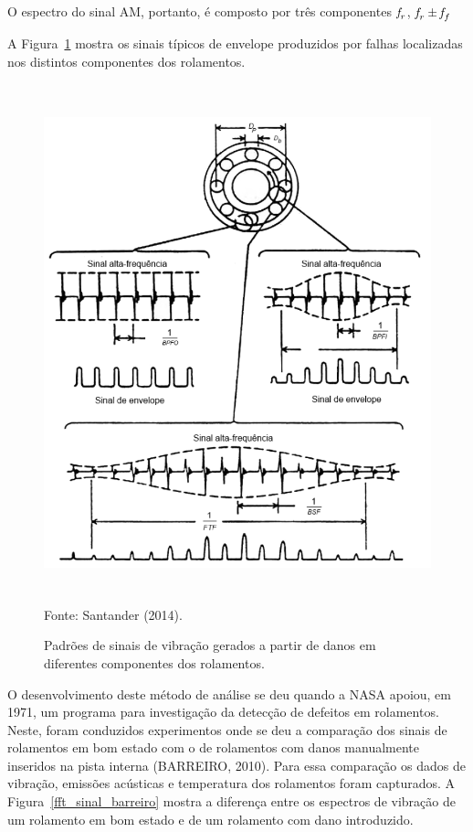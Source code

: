 \documentclass[
	12pt,				
	oneside,			
	a4paper,			
	english,			
	brazil,			
	]{abntex2ppgsi}
\newcommand{\f}{\mkern-2mu f\mkern-3mu}
\begin{document}
O espectro do sinal AM, portanto, é composto por três componentes ${\f}_r$, ${\f}_r \pm {\f}_f$ 

A Figura~\ref{frequencias_sinais_rolamentos} mostra os sinais típicos de envelope produzidos por falhas localizadas nos distintos componentes dos rolamentos. 

\begin{figure}[!htb]
\centering
\caption {Padrões de sinais de vibração gerados a partir de danos em diferentes componentes dos rolamentos.}
\includegraphics[width=\textwidth,height=150mm,keepaspectratio]{frequencias_sinais_rolamentos} \\
Fonte: Santander (2014).
\label{frequencias_sinais_rolamentos}
\end{figure}

O desenvolvimento deste método de análise se deu quando a NASA apoiou, em 1971, um programa para investigação da detecção de defeitos em rolamentos. Neste, foram conduzidos experimentos onde se deu a comparação dos sinais de rolamentos em bom estado com o de rolamentos com danos manualmente inseridos na pista interna (BARREIRO, 2010). Para essa comparação os dados de vibração, emissões acústicas e temperatura dos rolamentos foram capturados. A Figura~\ref{fft_sinal_barreiro} mostra a diferença entre os espectros de vibração de um rolamento em bom estado e de um rolamento com dano introduzido.
\end{document}
